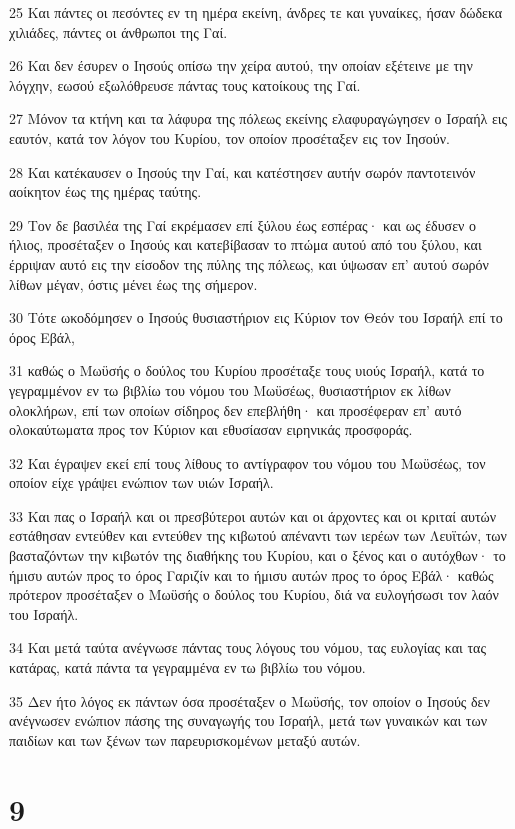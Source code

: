 \par 25 Και πάντες οι πεσόντες εν τη ημέρα εκείνη, άνδρες τε και γυναίκες, ήσαν δώδεκα χιλιάδες, πάντες οι άνθρωποι της Γαί.
\par 26 Και δεν έσυρεν ο Ιησούς οπίσω την χείρα αυτού, την οποίαν εξέτεινε με την λόγχην, εωσού εξωλόθρευσε πάντας τους κατοίκους της Γαί.
\par 27 Μόνον τα κτήνη και τα λάφυρα της πόλεως εκείνης ελαφυραγώγησεν ο Ισραήλ εις εαυτόν, κατά τον λόγον του Κυρίου, τον οποίον προσέταξεν εις τον Ιησούν.
\par 28 Και κατέκαυσεν ο Ιησούς την Γαί, και κατέστησεν αυτήν σωρόν παντοτεινόν αοίκητον έως της ημέρας ταύτης.
\par 29 Τον δε βασιλέα της Γαί εκρέμασεν επί ξύλου έως εσπέρας· και ως έδυσεν ο ήλιος, προσέταξεν ο Ιησούς και κατεβίβασαν το πτώμα αυτού από του ξύλου, και έρριψαν αυτό εις την είσοδον της πύλης της πόλεως, και ύψωσαν επ' αυτού σωρόν λίθων μέγαν, όστις μένει έως της σήμερον.
\par 30 Τότε ωκοδόμησεν ο Ιησούς θυσιαστήριον εις Κύριον τον Θεόν του Ισραήλ επί το όρος Εβάλ,
\par 31 καθώς ο Μωϋσής ο δούλος του Κυρίου προσέταξε τους υιούς Ισραήλ, κατά το γεγραμμένον εν τω βιβλίω του νόμου του Μωϋσέως, θυσιαστήριον εκ λίθων ολοκλήρων, επί των οποίων σίδηρος δεν επεβλήθη· και προσέφεραν επ' αυτό ολοκαύτωματα προς τον Κύριον και εθυσίασαν ειρηνικάς προσφοράς.
\par 32 Και έγραψεν εκεί επί τους λίθους το αντίγραφον του νόμου του Μωϋσέως, τον οποίον είχε γράψει ενώπιον των υιών Ισραήλ.
\par 33 Και πας ο Ισραήλ και οι πρεσβύτεροι αυτών και οι άρχοντες και οι κριταί αυτών εστάθησαν εντεύθεν και εντεύθεν της κιβωτού απέναντι των ιερέων των Λευϊτών, των βασταζόντων την κιβωτόν της διαθήκης του Κυρίου, και ο ξένος και ο αυτόχθων· το ήμισυ αυτών προς το όρος Γαριζίν και το ήμισυ αυτών προς το όρος Εβάλ· καθώς πρότερον προσέταξεν ο Μωϋσής ο δούλος του Κυρίου, διά να ευλογήσωσι τον λαόν του Ισραήλ.
\par 34 Και μετά ταύτα ανέγνωσε πάντας τους λόγους του νόμου, τας ευλογίας και τας κατάρας, κατά πάντα τα γεγραμμένα εν τω βιβλίω του νόμου.
\par 35 Δεν ήτο λόγος εκ πάντων όσα προσέταξεν ο Μωϋσής, τον οποίον ο Ιησούς δεν ανέγνωσεν ενώπιον πάσης της συναγωγής του Ισραήλ, μετά των γυναικών και των παιδίων και των ξένων των παρευρισκομένων μεταξύ αυτών.

\chapter{9}

